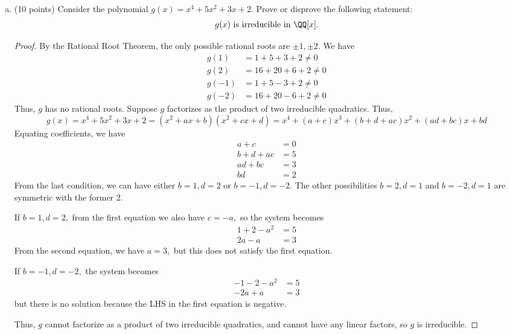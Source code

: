 \documentclass{article}
\begin{document}
\begin{itemize}
\begin{enumerate}[(a)]
			\item (10 points) Consider the polynomial $g(x)=x^4+5x^2+3x+2.$ Prove or disprove the following statement:
				\[g(x)\text{ is irreducible in }\QQ[x].\]
				\begin{proof}
					By the Rational Root Theorem, the only possible rational roots are $\pm 1, \pm 2.$ We have
					\begin{align*}
						g(1) &= 1+5+3+2\neq 0 \\
						g(2) &= 16+20+6+2\neq 0 \\
						g(-1) &= 1+5-3+2\neq 0 \\
						g(-2) &= 16+20-6+2\neq 0
					\end{align*}
					Thus, $g$ has no rational roots. Suppose $g$ factorizes as the product of two irreducible quadratics. Thus, 
					\[g(x)=x^4+5x^2+3x+2=(x^2+ax+b)(x^2+cx+d)=x^4+(a+c)x^3+(b+d+ac)x^2+(ad+bc)x+bd\]
					Equating coefficients, we have
					\begin{align*}
						a+c &= 0 \\
						b+d+ac &= 5 \\
						ad+bc &= 3 \\
						bd &= 2
					\end{align*}
					From the last condition, we can have either $b=1, d=2$ or $b=-1, d=-2.$ The other possibilities $b=2, d=1$ and $b=-2, d=1$ are symmetric with the former 2.

					If $b=1, d=2,$ from the first equation we also have $c=-a,$ so the system becomes
					\begin{align*}
						1+2-a^2 &= 5 \\
						2a-a &= 3 
					\end{align*}
					From the second equation, we have $a=3,$ but this does not satisfy the first equation. 

					If $b=-1, d=-2,$ the system becomes
					\begin{align*}
						-1-2-a^2 &= 5 \\
						-2a+a &= 3
					\end{align*}
					but there is no solution because the LHS in the first equation is negative.

					Thus, $g$ cannot factorize as a product of two irreducible quadratics, and cannot have any linear factors, so $g$ is irreducible.
				\end{proof}
		\end{enumerate}

\end{itemize}
\end{document}
